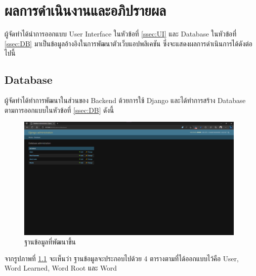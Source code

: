 \documentclass[12pt,oneside,openright,a4paper]{cpe-thai-project}
\begin{document}
\chapter{ผลการดำเนินงานและอภิปรายผล}

\hspace{1cm}
ผู้จัดทำได้นำการออกแบบ User Interface ในหัวข้อที่ \ref{ssec:UI} และ Database ในหัวข้อที่ \ref{ssec:DB}
มาเป็นข้อมูลอ้างอิงในการพัฒนาตัวเว็บแอปพลิเคชัน ซึ่งจะแสดงผลการดำเนินการได้ดังต่อไปนี้

\section{Database}
\hspace{1cm}
ผู้จัดทำได้ทำการพัฒนาในส่วนของ Backend ด้วยการใช้ Django และได้ทำการสร้าง Database ตามการออกแบบในหัวข้อที่ \ref{ssec:DB}
ดังนี้

\begin{figure}[!h]\centering
	\includegraphics[width=\textwidth, keepaspectratio=true]{image/chap4/DB/db.png}
	\caption{{ฐานข้อมูลที่พัฒนาขึ้น}}\label{fig:chap4DB}
\end{figure}
\hspace{1cm}
จากรูปภาพที่ \ref{fig:chap4DB} จะเห็นว่า ฐานข้อมูลจะประกอบไปด้วย 4 ตารางตามที่ได้ออกแบบไว้คือ User, Word Learned,
Word Root และ Word 
\end{document}
